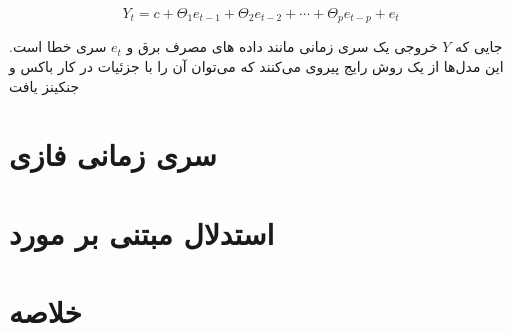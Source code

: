     \begin{equation}\label{eq:q}
        Y_t = c + \Theta_1 e_{t-1} + \Theta_2 e_{t-2} + \cdots + \Theta_p e_{t-p} + e_t
    \end{equation}

    جایی که $Y$ خروجی یک سری زمانی مانند داده های مصرف برق و $e_t$ سری خطا است. این مدل‌ها از یک روش رایج پیروی می‌کنند که 
    می‌توان آن را با جزئیات در کار باکس و جنکینز یافت
    \cite{box2015time}
\section{سری زمانی فازی}
\section{استدلال مبتنی بر مورد}
\section{خلاصه}